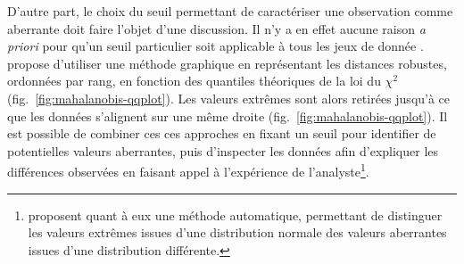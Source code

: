 \documentclass[
  french,
]{scrbook}
\begin{document}
D'autre part, le choix du seuil permettant de caractériser une observation comme aberrante doit faire l'objet d'une discussion. Il n'y a en effet aucune raison \emph{a priori} pour qu'un seuil particulier soit applicable à tous les jeux de donnée \autocite{filzmoser2005}. \textcite{garrett1989} propose d'utiliser une méthode graphique en représentant les distances robustes, ordonnées par rang, en fonction des quantiles théoriques de la loi du \(\chi^2\) (fig.~\ref{fig:mahalanobis-qqplot}). Les valeurs extrêmes sont alors retirées jusqu'à ce que les données s'alignent sur une même droite (fig.~\ref{fig:mahalanobis-qqplot}). Il est possible de combiner ces ces approches en fixant un seuil pour identifier de potentielles valeurs aberrantes, puis d'inspecter les données afin d'expliquer les différences observées en faisant appel à l'expérience de l'analyste\footnote{\textcite{filzmoser2005} proposent quant à eux une méthode automatique, permettant de distinguer les valeurs extrêmes issues d'une distribution normale des valeurs aberrantes issues d'une distribution différente.}.
\end{document}

